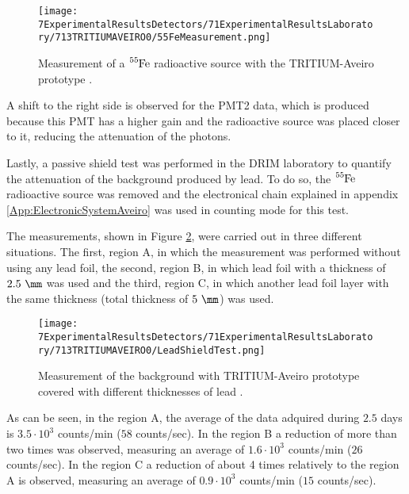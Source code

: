 \begin{figure}[h]
\centering
\texttt{[image: 7ExperimentalResultsDetectors/71ExperimentalResultsLaboratory/713TRITIUMAVEIRO0/55FeMeasurement.png]}
\caption{Measurement of a $\ce{^{55}Fe}$ radioactive source with the TRITIUM-Aveiro prototype \cite{ExperimentalPaperCarlos}.\label{fig:55FeMeasurement}}
\end{figure}

A shift to the right side is observed for the PMT2 data, which is produced because this PMT has a higher gain and the radioactive source was placed closer to it, reducing the attenuation of the photons.

Lastly, a passive shield test was performed in the DRIM laboratory to quantify the attenuation of the background produced by lead. To do so, the $\ce{^{55}Fe}$ radioactive source was removed and the electronical chain explained in appendix \ref{App:ElectronicSystemAveiro} was used in counting mode for this test.

The measurements, shown in Figure \ref{fig:LeadShieldTest}, were carried out in three different situations. The first, region A, in which the measurement was performed without using any lead foil, the second, region B, in which lead foil with a thickness of $2.5~\mm$ was used and the third, region C, in which another lead foil layer with the same thickness (total thickness of $5~\mm$) was used.

\begin{figure}[h]
\centering
\texttt{[image: 7ExperimentalResultsDetectors/71ExperimentalResultsLaboratory/713TRITIUMAVEIRO0/LeadShieldTest.png]}
\caption{Measurement of the background with TRITIUM-Aveiro prototype covered with different thicknesses of lead \cite{ExperimentalPaperCarlos}.\label{fig:LeadShieldTest}}
\end{figure}

As can be seen, in the region A, the average of the data adquired during $2.5$ days is $3.5 \cdot{} 10^3$ counts/min ($58$ counts/sec). In the region B a reduction of more than two times was observed, measuring an average of $1.6 \cdot{} 10^3$ counts/min ($26$ counts/sec). In the region C a reduction of about 4 times relatively to the region A is observed, measuring an average of $0.9 \cdot{} 10^3$ counts/min ($15$ counts/sec).


